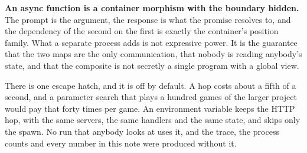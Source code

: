 \documentclass[11pt,a4paper]{article}
\begin{document}
\begin{sectionbox}
\textbf{An async function is a container morphism with the boundary hidden.} The
prompt is the argument, the response is what the promise resolves to, and the
dependency of the second on the first is exactly the container's position family. What
a separate process adds is not expressive power. It is the guarantee that the two maps
are the only communication, that nobody is reading anybody's state, and that the
composite is not secretly a single program with a global view.
\end{sectionbox}

There is one escape hatch, and it is off by default. A hop costs about a fifth of a
second, and a parameter search that plays a hundred games of the larger project would
pay that forty times per game. An environment variable keeps the HTTP hop, with the
same servers, the same handlers and the same state, and skips only the spawn. No run
that anybody looks at uses it, and the trace, the process counts and every number in
this note were produced without it.
\end{document}
